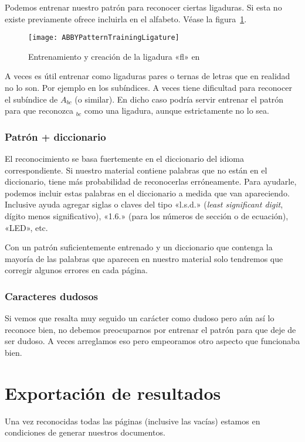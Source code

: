 \documentclass[%
	a5paper,
	10pt,
	twoside,
	openright,
	final,
]{memoir}
\begin{document}
	Podemos entrenar nuestro patrón para reconocer ciertas ligaduras. Si esta no existe previamente \abby ofrece incluirla en el alfabeto. Véase la figura~\ref{fig:ABBYPatternTrainingLigature}.

	\begin{figure}
		\texttt{[image: ABBYPatternTrainingLigature]}
		\caption{Entrenamiento y creación de la ligadura «fl» en \abby\label{fig:ABBYPatternTrainingLigature}}
	\end{figure}

	A veces es útil entrenar como ligaduras pares o ternas de letras que en realidad no lo son. Por ejemplo en los subíndices. A veces \abby tiene dificultad para reconocer el subíndice de $A_{bc}$ (o similar). En dicho caso podría servir entrenar el patrón para que reconozca $_{bc}$ como una ligadura, aunque estrictamente no lo sea.

	\subsubsection{Patrón + diccionario} El reconocimiento se basa fuertemente en el diccionario del idioma correspondiente. Si nuestro material contiene palabras que no están en el diccionario, \abby tiene más probabilidad de reconocerlas erróneamente. Para ayudarle, podemos incluir estas palabras en el diccionario a medida que van apareciendo. Inclusive ayuda agregar siglas o claves del tipo «l.s.d.» (\emph{least significant digit}, dígito menos significativo), «1.6.» (para los números de sección o de ecuación), «LED», etc.

	Con un patrón suficientemente entrenado y un diccionario que contenga la mayoría de las palabras que aparecen en nuestro material solo tendremos que corregir algunos errores en cada página.

	\subsubsection{Caracteres dudosos} Si vemos que resalta muy seguido un carácter como dudoso pero aún así lo reconoce bien, no debemos preocuparnos por entrenar el patrón para que deje de ser dudoso. A veces arreglamos eso pero empeoramos otro aspecto que funcionaba bien. %

	\section{Exportación de resultados} Una vez reconocidas todas las páginas (inclusive las vacías) estamos en condiciones de generar nuestros documentos.
\end{document}
